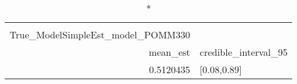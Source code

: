 \begin{longtable}{rl}
\caption*{
{\large Ssummarytable} \\ 
{\small True\_ModelSimpleEst\_model\_POMM330}
} \\ 
\toprule
mean\_est & credible\_interval\_95 \\ 
\midrule
0.5120435 & [0.08,0.89] \\ 
\bottomrule
\end{longtable}

